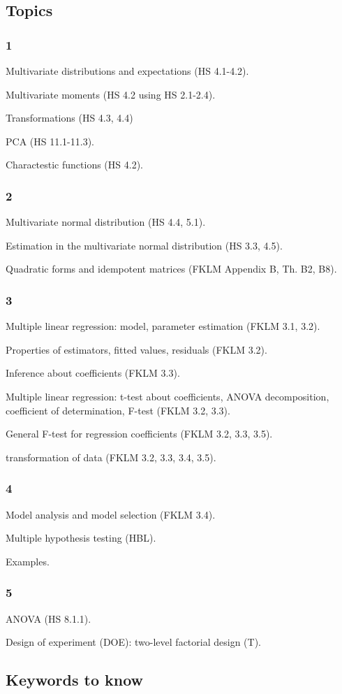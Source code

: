 \subsection*{Topics}
\subsubsection*{1}
Multivariate distributions and expectations (HS 4.1-4.2).

Multivariate moments (HS 4.2 using HS 2.1-2.4).

Transformations (HS 4.3, 4.4)

PCA (HS 11.1-11.3).

Charactestic functions (HS 4.2). 


\subsubsection*{2}
Multivariate normal distribution (HS 4.4, 5.1).

Estimation in the multivariate normal distribution (HS 3.3, 4.5).

Quadratic forms and idempotent matrices (FKLM Appendix B, Th. B2, B8).


\subsubsection*{3}
Multiple linear regression: model, parameter estimation (FKLM 3.1, 3.2).

Properties of estimators, fitted values, residuals (FKLM 3.2). 

Inference about coefficients (FKLM 3.3).

Multiple linear regression: t-test about coefficients, ANOVA decomposition, coefficient of determination, F-test (FKLM 3.2, 3.3).

General F-test for regression coefficients (FKLM 3.2, 3.3, 3.5).

transformation of data (FKLM 3.2, 3.3, 3.4, 3.5).



\subsubsection*{4}
Model analysis and model selection (FKLM 3.4).

Multiple hypothesis testing (HBL).

Examples.


\subsubsection*{5}
ANOVA (HS 8.1.1). 

Design of experiment (DOE): two-level factorial design (T).

\subsection*{Keywords to know}
